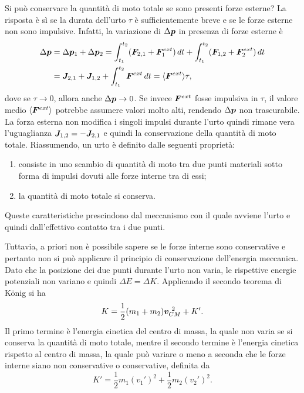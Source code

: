 Si può conservare la quantità di moto totale se sono presenti forze esterne? La risposta è sì se la durata dell'urto $\tau$ è sufficientemente breve e se le forze esterne non sono impulsive. Infatti, la variazione di $\Delta\bm{p}$ in presenza di forze esterne è
\begin{equation}
\begin{split}
    \Delta\bm{p}&=\Delta\bm{p}_1+\Delta\bm{p}_2=\int_{t_1}^{t_2}(\bm{F}_{2,1}+\bm{F}^{ext}_1)\,dt+\int_{t_1}^{t_2}(\bm{F}_{1,2}+\bm{F}^{ext}_2)\,dt \\
    &=\bm{J}_{2,1}+\bm{J}_{1,2}+\int_{t_1}^{t_2}\bm{F}^{ext}\,dt=\langle \bm{F}^{ext}\rangle\tau,
\end{split}
\end{equation}
dove se $\tau\to0$, allora anche $\Delta\bm{p}\to0$. Se invece $\bm{F}^{ext}$ fosse impulsiva in $\tau$, il valore medio $\langle \bm{F}^{ext}\rangle$ potrebbe assumere valori molto alti, rendendo $\Delta\bm{p}$ non trascurabile. La forza esterna non modifica i singoli impulsi durante l'urto quindi rimane vera l'uguaglianza $\bm{J}_{1,2}=-\bm{J}_{2,1}$ e quindi la conservazione della quantità di moto totale. Riassumendo, un urto è definito dalle seguenti proprietà:
\begin{enumerate}
    \item consiste in uno scambio di quantità di moto tra due punti materiali sotto forma di impulsi dovuti alle forze interne tra di essi;
    \item la quantità di moto totale si conserva.
\end{enumerate}
Queste caratteristiche prescindono dal meccanismo con il quale avviene l'urto e quindi dall'effettivo contatto tra i due punti. 

Tuttavia, a priori non è possibile sapere se le forze interne sono conservative e pertanto non si può applicare il principio di conservazione dell'energia meccanica. Dato che la posizione dei due punti durante l'urto non varia, le rispettive energie potenziali non variano e quindi $\Delta E=\Delta K$. Applicando il secondo teorema di K\"onig si ha
\begin{equation}
    K=\frac{1}{2}(m_1+m_2)\bm{v}_{CM}^{\ 2}+K'.
\end{equation}
Il primo termine è l'energia cinetica del centro di massa, la quale non varia se si conserva la quantità di moto totale, mentre il secondo termine è l'energia cinetica rispetto al centro di massa, la quale può variare o meno a seconda che le forze interne siano non conservative o conservative, definita da
\begin{equation}
    K'=\frac{1}{2}m_1(v_1')^2+\frac{1}{2}m_2(v_2')^2.
\end{equation}

